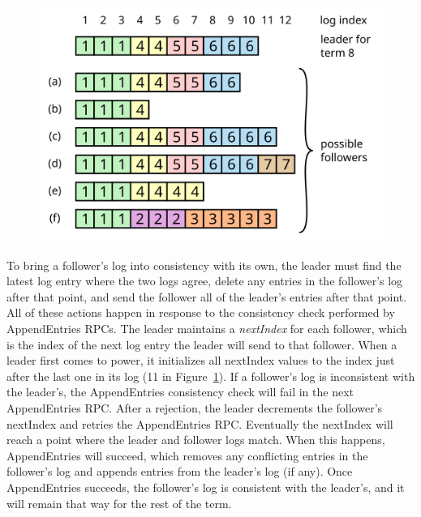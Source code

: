 \begin{figure}
\centering
\includegraphics[scale=.50]{basicraft/diverge2}
\label{fig:basicraft:diverge}
\end{figure}

To bring a follower's log into consistency with its own,
the leader must find the latest log entry where the two logs agree,
delete any entries in the follower's log after that point,
and send the follower all of the leader's entries after that point.
All of these actions happen in response to the consistency check performed
by AppendEntries RPCs.
The leader maintains a \emph{nextIndex} for each follower, which
is the index of the next log entry the leader will send to that
follower. When a leader first comes to power, it initializes all nextIndex values
to the index just after the last one in its log (11 in
Figure~\ref{fig:basicraft:diverge}).
If a follower's log is inconsistent with the leader's, the AppendEntries
consistency check will fail in the next AppendEntries RPC.
After a rejection, the leader decrements the follower's nextIndex
and retries the AppendEntries
RPC. Eventually the nextIndex will reach a point where the leader and
follower logs match.
When this happens, AppendEntries will
succeed, which removes any conflicting entries in the follower's
log and appends
entries from the leader's log (if any). Once AppendEntries succeeds, the
follower's log is consistent with the leader's, and it will remain that way
for the rest of the term.

